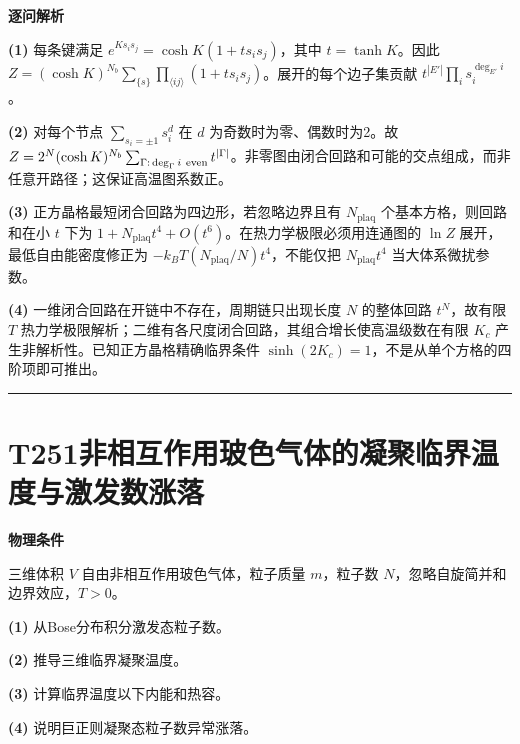 \documentclass[UTF8,a4paper,11pt,oneside,openany]{ctexbook}
\begin{document}
\par\medskip\noindent\textbf{逐问解析}
\par\noindent\textbf{(1)} 每条键满足 \(e^{Ks_is_j}=\cosh K(1+t s_is_j)\)，其中 \(t=\tanh K\)。因此 \(Z=(\cosh K)^{N_b}\sum_{\{s\}}\prod_{\langle ij\rangle}(1+t s_is_j)\)。展开的每个边子集贡献 \(t^{|E'|}\prod_i s_i^{\deg_{E'}i}\)。
\par\noindent\textbf{(2)} 对每个节点 \(\sum_{s_i=\pm1}s_i^d\) 在 \(d\) 为奇数时为零、偶数时为2。故 \(Z=2^N(\cosh K)^{N_b}\sum_{\Gamma:\,\deg_\Gamma i\ {\rm even}}t^{|\Gamma|}\)。非零图由闭合回路和可能的交点组成，而非任意开路径；这保证高温图系数正。
\par\noindent\textbf{(3)} 正方晶格最短闭合回路为四边形，若忽略边界且有 \(N_\mathrm{plaq}\) 个基本方格，则回路和在小 \(t\) 下为 \(1+N_\mathrm{plaq} t^4+O(t^6)\)。在热力学极限必须用连通图的 \(\ln Z\) 展开，最低自由能密度修正为 \(-k_BT(N_\mathrm{plaq}/N)t^4\)，不能仅把 \(N_\mathrm{plaq} t^4\) 当大体系微扰参数。
\par\noindent\textbf{(4)} 一维闭合回路在开链中不存在，周期链只出现长度 \(N\) 的整体回路 \(t^N\)，故有限 \(T\) 热力学极限解析；二维有各尺度闭合回路，其组合增长使高温级数在有限 \(K_c\) 产生非解析性。已知正方晶格精确临界条件 \(\sinh(2K_c)=1\)，不是从单个方格的四阶项即可推出。

\par\bigskip\hrule\bigskip
\section*{T251\quad 非相互作用玻色气体的凝聚临界温度与激发数涨落}
\textbf{物理条件}\par 三维体积 \(V\) 自由非相互作用玻色气体，粒子质量 \(m\)，粒子数 \(N\)，忽略自旋简并和边界效应，\(T>0\)。
\par\noindent\textbf{(1)} 从Bose分布积分激发态粒子数。
\par\noindent\textbf{(2)} 推导三维临界凝聚温度。
\par\noindent\textbf{(3)} 计算临界温度以下内能和热容。
\par\noindent\textbf{(4)} 说明巨正则凝聚态粒子数异常涨落。
\end{document}
